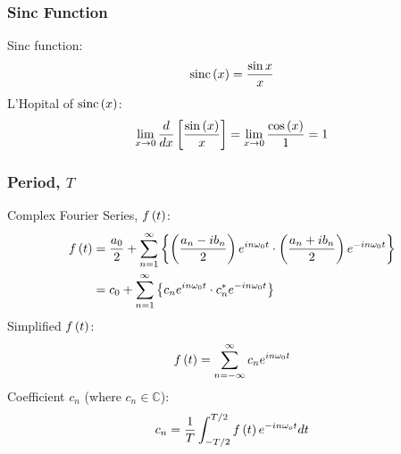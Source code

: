 \subsubsection{Sinc Function}
Sinc function:
\begin{equation}
    \operatorname{sinc}\left(x\right)=\frac{\sin{x}}{x}
\end{equation}
L'Hopital of $\operatorname{sinc}\left(x\right)$:
\begin{equation}
    \lim_{x\rightarrow 0}\frac{d}{dx}\left[\frac{\sin\left(x\right)}{x}\right]=\lim_{x\rightarrow 0}\frac{\cos\left(x
    \right)}{1}=1
\end{equation}
\subsubsection{Period, $T$}
Complex Fourier Series, $f\left(t\right)$:
\begin{align}
    f\left(t\right)&=\frac{a_0}{2}+\sum_{n=1}^{\infty}\left\{\left(\frac{a_n-ib_n}{2}\right)e^{in\omega_0t}\cdot\left(\frac{a_n+ib_n}{2}\right)e^{-in\omega_0t}\right\}\nonumber\\
    &=c_0+\sum_{n=1}^{\infty}\left\{c_ne^{in\omega_0t}\cdot c_n^*e^{-in\omega_0t}\right\}\nonumber
\end{align}
Simplified $f\left(t\right)$:
\begin{equation}
    f\left(t\right)=\sum_{n=-\infty}^{\infty}c_ne^{in\omega_0t}
\end{equation}
Coefficient $c_n$ (where $c_n\in\mathbb{C}$):
\begin{equation}
    c_n=\frac{1}{T}\int_{-T/2}^{T/2}f\left(t\right)e^{-in\omega_ot}dt
\end{equation}
